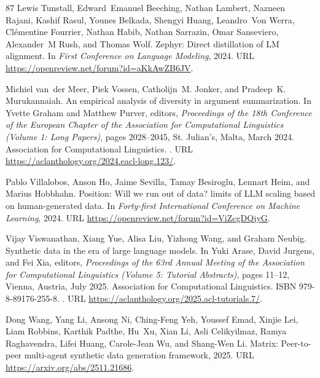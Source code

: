 \begin{thebibliography}{87}
Lewis Tunstall, Edward~Emanuel Beeching, Nathan Lambert, Nazneen Rajani, Kashif Rasul, Younes Belkada, Shengyi Huang, Leandro~Von Werra, Cl{\'e}mentine Fourrier, Nathan Habib, Nathan Sarrazin, Omar Sanseviero, Alexander~M Rush, and Thomas Wolf.
\newblock Zephyr: Direct distillation of {LM} alignment.
\newblock In \emph{First Conference on Language Modeling}, 2024.
\newblock URL \url{https://openreview.net/forum?id=aKkAwZB6JV}.

Michiel van~der Meer, Piek Vossen, Catholijn~M. Jonker, and Pradeep~K. Murukannaiah.
\newblock An empirical analysis of diversity in argument summarization.
\newblock In Yvette Graham and Matthew Purver, editors, \emph{Proceedings of the 18th Conference of the European Chapter of the Association for Computational Linguistics (Volume 1: Long Papers)}, pages 2028--2045, St. Julian{'}s, Malta, March 2024. Association for Computational Linguistics.
\newblock {}.
\newblock URL \url{https://aclanthology.org/2024.eacl-long.123/}.

Pablo Villalobos, Anson Ho, Jaime Sevilla, Tamay Besiroglu, Lennart Heim, and Marius Hobbhahn.
\newblock Position: Will we run out of data? limits of {LLM} scaling based on human-generated data.
\newblock In \emph{Forty-first International Conference on Machine Learning}, 2024.
\newblock URL \url{https://openreview.net/forum?id=ViZcgDQjyG}.

Vijay Viswanathan, Xiang Yue, Alisa Liu, Yizhong Wang, and Graham Neubig.
\newblock Synthetic data in the era of large language models.
\newblock In Yuki Arase, David Jurgens, and Fei Xia, editors, \emph{Proceedings of the 63rd Annual Meeting of the Association for Computational Linguistics (Volume 5: Tutorial Abstracts)}, pages 11--12, Vienna, Austria, July 2025. Association for Computational Linguistics.
\newblock ISBN 979-8-89176-255-8.
\newblock {}.
\newblock URL \url{https://aclanthology.org/2025.acl-tutorials.7/}.

Dong Wang, Yang Li, Ansong Ni, Ching-Feng Yeh, Youssef Emad, Xinjie Lei, Liam Robbins, Karthik Padthe, Hu~Xu, Xian Li, Asli Celikyilmaz, Ramya Raghavendra, Lifei Huang, Carole-Jean Wu, and Shang-Wen Li.
\newblock Matrix: Peer-to-peer multi-agent synthetic data generation framework, 2025{}.
\newblock URL \url{https://arxiv.org/abs/2511.21686}.


\end{thebibliography}
